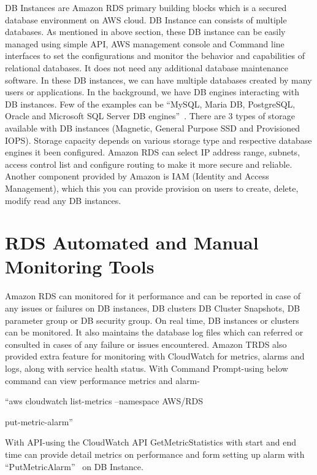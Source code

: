 DB Instances are Amazon RDS primary building blocks which is a secured database 
environment on AWS cloud. DB Instance can consists of multiple databases. 
As mentioned in above section, these DB instance can 
be easily managed using simple API, AWS management console and Command line 
interfaces to set the configurations and monitor the behavior and capabilities 
of relational databases. It does not need any additional database maintenance 
software. In these DB instances, we can have multiple databases created by many 
users or 
applications.
In the background, we have DB engines interacting with DB instances. Few of the 
examples can be ``MySQL, Maria DB, PostgreSQL, Oracle and Microsoft SQL Server DB 
engines''~\cite{hid-sp18-520-amazonrds}.
There are 3 types of storage available with DB instances (Magnetic, General 
Purpose SSD and Provisioned IOPS).
Storage capacity depends on various storage type and respective database engines 
it been configured.
Amazon RDS can select IP address range, subnets, access control list and 
configure routing to make it more secure and reliable.
Another component provided by Amazon is IAM (Identity and Access Management), 
which this you can provide provision on users to create, delete, modify read 
any DB instances.

\section{RDS Automated and Manual Monitoring Tools}

Amazon RDS can monitored for it performance and can be reported in case of 
any issues or failures on DB instances, DB clusters DB Cluster Snapshots, DB 
parameter group or DB security group.
On real time, DB instances or clusters can be monitored. It also maintains the 
database log files which can referred or consulted in cases of any failure or 
issues encountered.  
Amazon TRDS also provided extra feature for monitoring with CloudWatch for 
metrics, alarms and logs, along with service health status.
With Command Prompt-using below command can view performance metrics and 
alarm- 

``aws cloudwatch list-metrics --namespace AWS/RDS

put-metric-alarm''~\cite{hid-sp18-520-amardsmon}

With API-using the CloudWatch API GetMetricStatistics with start and end time 
can provide detail metrics on performance and form setting up alarm 
with ``PutMetricAlarm''~\cite{hid-sp18-520-amardsmon} on DB Instance.

